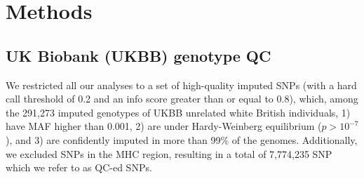 
\section{Methods}
\subsection{UK Biobank (UKBB) genotype QC}
We restricted all our analyses to a set of high-quality imputed SNPs (with a hard call threshold of 0.2 and an info score greater than or equal to 0.8), which, among the 291,273 imputed genotypes of UKBB unrelated white British individuals, 1) have MAF higher than 0.001, 2) are under Hardy-Weinberg equilibrium ($p > 10^{-7}$), and 3) are confidently imputed in more than 99\% of the genomes. Additionally, we excluded SNPs in the MHC region, resulting in a total of 7,774,235 SNP which we refer to as QC-ed SNPs.
